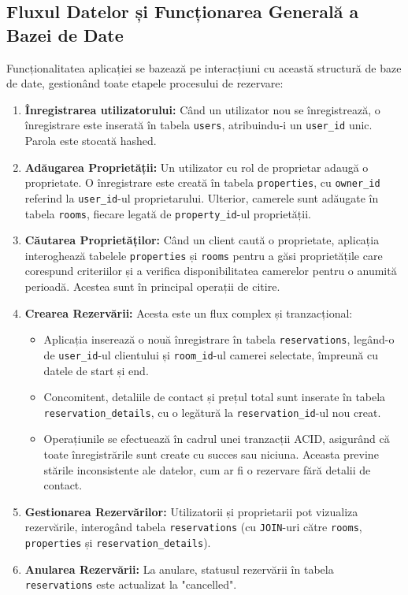 \documentclass[12pt, a4paper, oneside, romanian]{teza-upb}
\begin{document}
\subsection{Fluxul Datelor și Funcționarea Generală a Bazei de Date}
Funcționalitatea aplicației se bazează pe interacțiuni cu această structură de baze de date, gestionând toate etapele procesului de rezervare:

\begin{enumerate}
	\item \textbf{Înregistrarea utilizatorului:} Când un utilizator nou se înregistrează, o înregistrare este inserată în tabela \texttt{users}, atribuindu-i un \texttt{user\_id} unic. Parola este stocată hashed.
	\item \textbf{Adăugarea Proprietății:} Un utilizator cu rol de proprietar adaugă o proprietate. O înregistrare este creată în tabela \texttt{properties}, cu \texttt{owner\_id} referind la \texttt{user\_id}-ul proprietarului. Ulterior, camerele sunt adăugate în tabela \texttt{rooms}, fiecare legată de \texttt{property\_id}-ul proprietății.
	\item \textbf{Căutarea Proprietăților:} Când un client caută o proprietate, aplicația interoghează tabelele \texttt{properties} și \texttt{rooms} pentru a găsi proprietățile care corespund criteriilor și a verifica disponibilitatea camerelor pentru o anumită perioadă. Acestea sunt în principal operații de citire.
	\item \textbf{Crearea Rezervării:} Acesta este un flux complex și tranzacțional:
	\begin{itemize}
		\item Aplicația inserează o nouă înregistrare în tabela \texttt{reservations}, legând-o de \texttt{user\_id}-ul clientului și \texttt{room\_id}-ul camerei selectate, împreună cu datele de start și end.
		\item Concomitent, detaliile de contact și prețul total sunt inserate în tabela \texttt{reservation\_details}, cu o legătură la \texttt{reservation\_id}-ul nou creat.
		\item Operațiunile se efectuează în cadrul unei tranzacții ACID, asigurând că toate înregistrările sunt create cu succes sau niciuna. Aceasta previne stările inconsistente ale datelor, cum ar fi o rezervare fără detalii de contact.
	\end{itemize}
	\item \textbf{Gestionarea Rezervărilor:} Utilizatorii și proprietarii pot vizualiza rezervările, interogând tabela \texttt{reservations} (cu \texttt{JOIN}-uri către \texttt{rooms}, \texttt{properties} și \texttt{reservation\_details}). 
	\item \textbf{Anularea Rezervării:} La anulare, statusul rezervării în tabela \texttt{reservations} este actualizat la "cancelled".
\end{enumerate}
\end{document}
